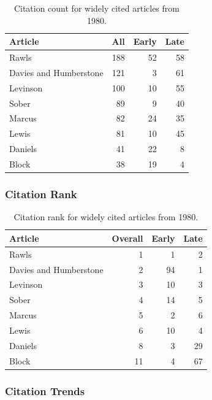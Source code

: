 \documentclass[
  10pt,
  letterpaper,
  DIV=11,
  numbers=noendperiod,
  twoside]{scrartcl}
\begin{document}
\begin{longtable}[]{@{}lrrr@{}}

\caption{\label{tbl-citation-count-1980}Citation count for widely cited
articles from 1980.}

\tabularnewline

\toprule\noalign{}
Article & All & Early & Late \\
\midrule\noalign{}
\endhead
\bottomrule\noalign{}
\endlastfoot
Rawls & 188 & 52 & 58 \\
Davies and Humberstone & 121 & 3 & 61 \\
Levinson & 100 & 10 & 55 \\
Sober & 89 & 9 & 40 \\
Marcus & 82 & 24 & 35 \\
Lewis & 81 & 10 & 45 \\
Daniels & 41 & 22 & 8 \\
Block & 38 & 19 & 4 \\

\end{longtable}

\subsubsection*{Citation Rank}\label{sec-rank-1980}

\begin{longtable}[]{@{}lrrr@{}}

\caption{\label{tbl-citation-rank-1980}Citation rank for widely cited
articles from 1980.}

\tabularnewline

\toprule\noalign{}
Article & Overall & Early & Late \\
\midrule\noalign{}
\endhead
\bottomrule\noalign{}
\endlastfoot
Rawls & 1 & 1 & 2 \\
Davies and Humberstone & 2 & 94 & 1 \\
Levinson & 3 & 10 & 3 \\
Sober & 4 & 14 & 5 \\
Marcus & 5 & 2 & 6 \\
Lewis & 6 & 10 & 4 \\
Daniels & 8 & 3 & 29 \\
Block & 11 & 4 & 67 \\

\end{longtable}

\subsubsection*{Citation Trends}\label{sec-trends-1980}
\end{document}
